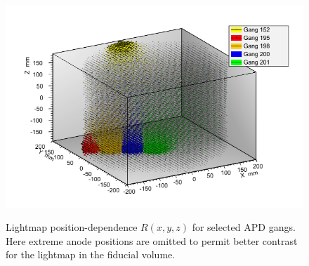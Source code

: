 \begin{figure}
\begin{center}
\includegraphics[keepaspectratio=true,width=\textwidth]{Lightmap_viz_zoom.png}
\end{center}
\renewcommand{\baselinestretch}{1}
\small\normalsize
\begin{quote}
\caption{Lightmap position-dependence $R(x,y,z)$ for selected APD gangs.  Here extreme anode positions are omitted to permit better contrast for the lightmap in the fiducial volume.}
\label{fig:Lightmap3DPlot_zoomed}
\end{quote}
\end{figure}
\renewcommand{\baselinestretch}{2}
\small\normalsize

